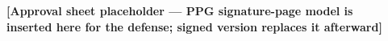 %
%


    \frenchspacing
    \OnehalfSpacing %

    \pretextual

    \ifdefensebuild
    {
        \singlespacing
        \imprimirfolhaderosto
        \clearpage
    }
    \ifapprovalsheet
    \begin{center}
        \vspace*{2cm}
        {\large\bfseries [Approval sheet placeholder --- PPG signature-page model is\\
        inserted here for the defense; signed version replaces it afterward]}
        \vspace*{\fill}
    \end{center}
    \clearpage
    \fi

